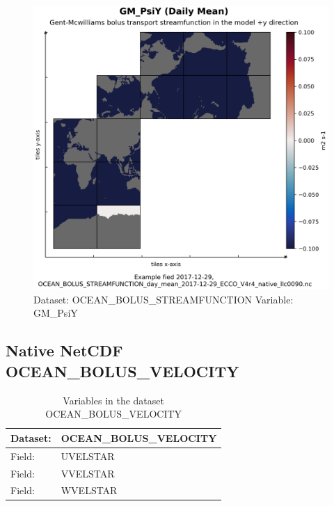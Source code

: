 \begin{figure}[H]
\centering
\includegraphics[scale=0.55]{../images/plots/native_plots/Gent-McWilliams_Bolus_Transport_Streamfunction/GM_PsiY.png}
\caption{Dataset: OCEAN\_BOLUS\_STREAMFUNCTION Variable: GM\_PsiY}
\label{tab:table-OCEAN_BOLUS_STREAMFUNCTION_GM_PsiY-Plot}
\end{figure}
\pagebreak
\subsection{Native NetCDF OCEAN\_BOLUS\_VELOCITY}
\newp
\begin{longtable}{|p{}|p{}|}
\caption{Variables in the dataset OCEAN\_BOLUS\_VELOCITY}
\label{tab:table-OCEAN_BOLUS_VELOCITY-fields} \\ 
\hline \endhead \hline \endfoot
\rowcolor{lightgray} \textbf{Dataset:} & \textbf{OCEAN\_BOLUS\_VELOCITY} \\ \hline
Field: &UVELSTAR \\ \hline
Field: &VVELSTAR \\ \hline
Field: &WVELSTAR \\ \hline
\end{longtable}

\pagebreak
